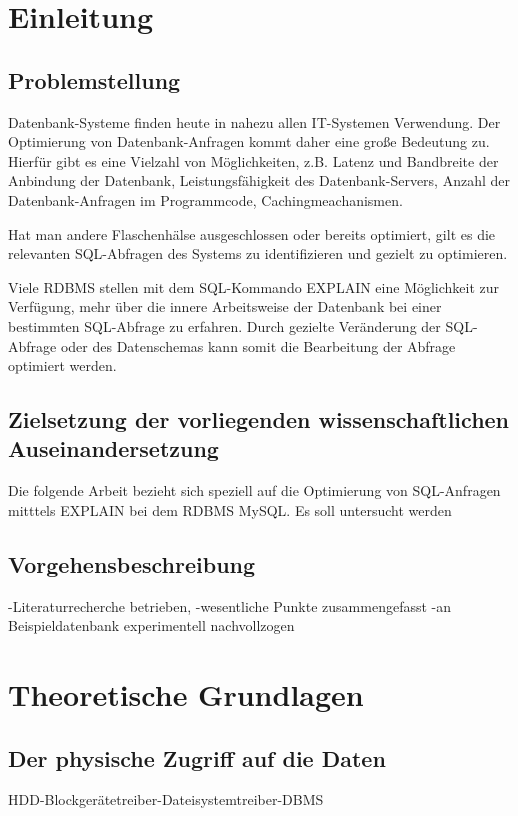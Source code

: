 
\section{Einleitung}
\subsection{Problemstellung}
Datenbank-Systeme finden heute in nahezu allen IT-Systemen Verwendung.
Der Optimierung von Datenbank-Anfragen kommt daher eine große Bedeutung zu.
Hierfür gibt es eine Vielzahl von Möglichkeiten, z.B. Latenz und Bandbreite der Anbindung der Datenbank, Leistungsfähigkeit des Datenbank-Servers, Anzahl der Datenbank-Anfragen im Programmcode, Cachingmeachanismen.

Hat man andere Flaschenhälse ausgeschlossen oder bereits optimiert,  gilt es die relevanten SQL-Abfragen des Systems zu identifizieren und gezielt zu optimieren.

Viele RDBMS stellen mit dem SQL-Kommando EXPLAIN eine Möglichkeit zur Verfügung, mehr über die innere Arbeitsweise der Datenbank bei einer bestimmten SQL-Abfrage zu erfahren.
Durch gezielte Veränderung der SQL-Abfrage oder des Datenschemas kann somit die Bearbeitung der Abfrage optimiert werden.

\subsection{Zielsetzung der vorliegenden  wissenschaftlichen  Auseinandersetzung}
Die folgende Arbeit bezieht sich speziell auf die Optimierung von SQL-Anfragen mitttels EXPLAIN bei dem RDBMS MySQL.
Es soll untersucht werden

\subsection{Vorgehensbeschreibung}
-Literaturrecherche betrieben,
-wesentliche Punkte zusammengefasst
-an Beispieldatenbank experimentell nachvollzogen

\section{Theoretische Grundlagen}
\subsection{Der physische Zugriff auf die Daten}
 HDD-Blockgerätetreiber-Dateisystemtreiber-DBMS
 
